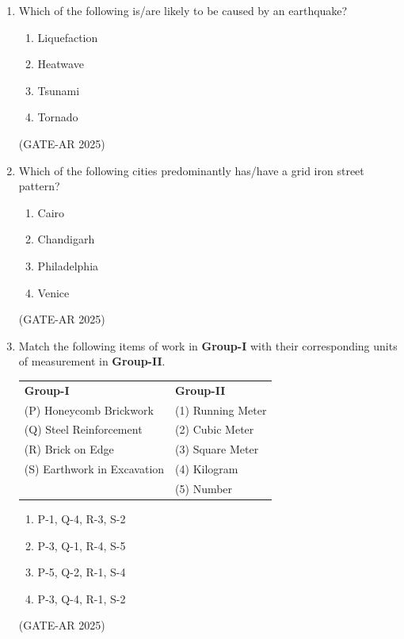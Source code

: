 \documentclass[a4paper,10pt]{article}
\begin{document}
\begin{enumerate}
    \item Which of the following is/are likely to be caused by an earthquake?
    \begin{multicols}{4}
    \begin{enumerate}
        \item Liquefaction
        \item Heatwave
        \item Tsunami
        \item Tornado
    \end{enumerate}
    \end{multicols}
    \hfill (GATE-AR 2025)

    \item Which of the following cities predominantly has/have a grid iron street pattern?
    \begin{multicols}{4}
    \begin{enumerate}
        \item Cairo
        \item Chandigarh
        \item Philadelphia
        \item Venice
    \end{enumerate}
    \end{multicols}
    \hfill (GATE-AR 2025)

    \item Match the following items of work in \textbf{Group-I} with their corresponding units of measurement in \textbf{Group-II}. \\
    \begin{tabular}{ l l }
    \textbf{Group-I} & \textbf{Group-II} \\
    (P) Honeycomb Brickwork & (1) Running Meter \\
    (Q) Steel Reinforcement & (2) Cubic Meter \\
    (R) Brick on Edge & (3) Square Meter \\
    (S) Earthwork in Excavation & (4) Kilogram \\
    & (5) Number \\
    \end{tabular}
    \begin{multicols}{2}
    \begin{enumerate}
        \item P-1, Q-4, R-3, S-2
        \item P-3, Q-1, R-4, S-5
        \item P-5, Q-2, R-1, S-4
        \item P-3, Q-4, R-1, S-2
    \end{enumerate}
    \end{multicols}
    \hfill (GATE-AR 2025)


\end{enumerate}
\end{document}
